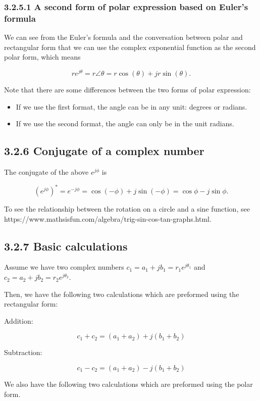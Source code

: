 \documentclass[11pt]{article}
\begin{document}
\subsubsection*{3.2.5.1 A second form of polar expression based on Euler's formula}

We can see from the Euler's formula and the conversation between polar and rectangular form that we can use the complex exponential function as the second polar form, which means

\[re^{j\theta} = r\angle\theta = r\cos(\theta) + jr\sin(\theta).\]

Note that there are some differences between the two forms of polar expression:

\begin{itemize}
  \item If we use the first format, the angle can be in any unit: degrees or radians.
  \item If we use the second format, the angle can only be in the unit radians.
\end{itemize}

\subsection*{3.2.6 Conjugate of a complex number}

The conjugate of the above $e^{j\phi}$ is

\[(e^{j\phi})^* = e^{-j\phi} = \cos(-\phi) + j\sin(-\phi) = \cos\phi - j\sin\phi.\]

To see the relationship between the rotation on a circle and a sine function, see https://www.mathsisfun.com/algebra/trig-sin-cos-tan-graphs.html.

\subsection*{3.2.7 Basic calculations}

Assume we have two complex numbers $c_1 = a_1 + jb_1 = r_1 e^{j\theta_1}$ and $c_2 = a_2 + jb_2 = r_2 e^{j\theta_2}$.

Then, we have the following two calculations which are preformed using the rectangular form:

Addition:

\[c_1 + c_2 = (a_1 + a_2) + j(b_1 + b_2)\]

Subtraction:

\[c_1 - c_2 = (a_1 + a_2) - j(b_1 + b_2)\]

We also have the following two calculations which are preformed using the polar form.
\end{document}

